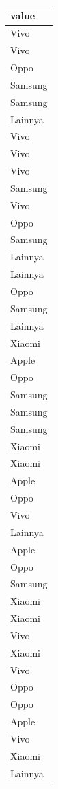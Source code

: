 \documentclass[
  letterpaper,
  DIV=11,
  numbers=noendperiod]{scrartcl}
\begin{document}
\begin{table}
\centering
\begin{tabular}[t]{l}
\hline
value\\
\hline
Vivo\\
\hline
Vivo\\
\hline
Oppo\\
\hline
Samsung\\
\hline
Samsung\\
\hline
Lainnya\\
\hline
Vivo\\
\hline
Vivo\\
\hline
Vivo\\
\hline
Samsung\\
\hline
Vivo\\
\hline
Oppo\\
\hline
Samsung\\
\hline
Lainnya\\
\hline
Lainnya\\
\hline
Oppo\\
\hline
Samsung\\
\hline
Lainnya\\
\hline
Xiaomi\\
\hline
Apple\\
\hline
Oppo\\
\hline
Samsung\\
\hline
Samsung\\
\hline
Samsung\\
\hline
Xiaomi\\
\hline
Xiaomi\\
\hline
Apple\\
\hline
Oppo\\
\hline
Vivo\\
\hline
Lainnya\\
\hline
Apple\\
\hline
Oppo\\
\hline
Samsung\\
\hline
Xiaomi\\
\hline
Xiaomi\\
\hline
Vivo\\
\hline
Xiaomi\\
\hline
Vivo\\
\hline
Oppo\\
\hline
Oppo\\
\hline
Apple\\
\hline
Vivo\\
\hline
Xiaomi\\
\hline
Lainnya\\

\end{tabular}
\end{table}
\end{document}
